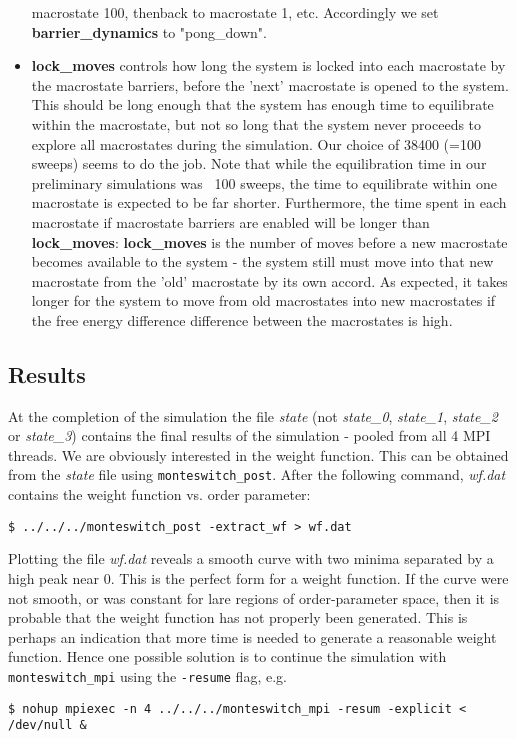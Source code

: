 \documentclass{report}
\begin{document}
\begin{itemize}
  macrostate 100, thenback to macrostate 1, etc. Accordingly we set \textbf{barrier\_dynamics} to "pong\_down".
\item \textbf{lock\_moves} controls how long the system is locked into each macrostate by the macrostate barriers, before the 'next' macrostate is 
  opened to the
  system. This should be long enough that the system has enough time to equilibrate within the macrostate, but not so long that the system never proceeds
  to explore all macrostates during the simulation. Our choice of 38400 (=100 sweeps) seems to do the job. Note that while the equilibration time in our 
  preliminary simulations was ~100 sweeps, the time to equilibrate within one macrostate is expected to be far shorter. Furthermore, the time spent in
  each macrostate if macrostate barriers are enabled will be longer than \textbf{lock\_moves}: \textbf{lock\_moves} is the number of moves before a 
  new macrostate becomes
  available to the system - the system still must move into that new macrostate from the 'old' macrostate by its own accord. As expected, it takes
  longer for the system to move from old macrostates into new macrostates if the free energy difference difference between the macrostates is high.
\end{itemize}

\subsection{Results}
At the completion of the simulation the file \emph{state} (not \emph{state\_0}, \emph{state\_1}, \emph{state\_2} or \emph{state\_3}) 
contains the final results of the simulation -
pooled from all 4 MPI threads. We are obviously interested in the weight function. This can be obtained from the \emph{state} file using 
\texttt{monteswitch\_post}.
After the following command, \emph{wf.dat} contains the weight function vs. order parameter:
\begin{verbatim}
$ ../../../monteswitch_post -extract_wf > wf.dat
\end{verbatim}
Plotting the file \emph{wf.dat} reveals a smooth curve with two minima separated by a high peak near 0. This is the perfect form for a weight function. If the
curve were not smooth, or was constant for lare regions of order-parameter space, then it is probable that the weight function has not properly been
generated. This is perhaps an indication that more time is needed to generate a reasonable weight function. Hence one possible solution is to continue
the simulation with \texttt{monteswitch\_mpi} using the \texttt{-resume} flag, e.g.
\begin{verbatim}
$ nohup mpiexec -n 4 ../../../monteswitch_mpi -resum -explicit < /dev/null &
\end{verbatim}
\end{document}
